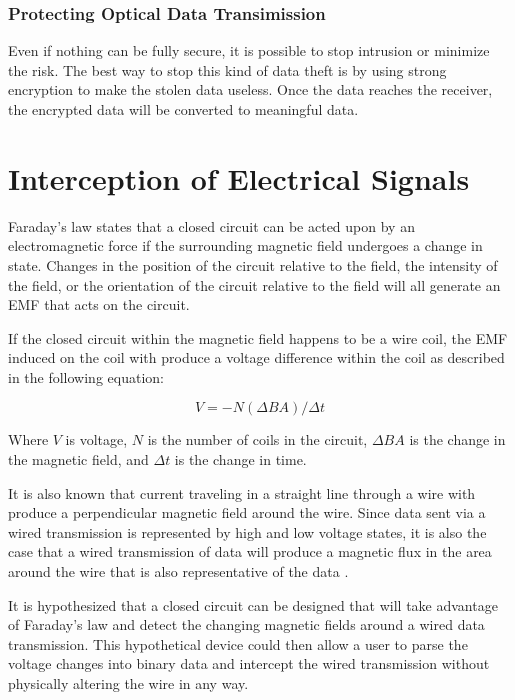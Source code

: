 \documentclass{article}
\begin{document}
\subsubsection{Protecting Optical Data Transimission}
Even if nothing can be fully secure, it is possible to stop intrusion or minimize the risk. The best way to stop this kind of data theft is by using strong encryption to make the stolen data useless. Once the data reaches the receiver, the encrypted data will be converted to meaningful data. 

\section{Interception of Electrical Signals}

Faraday's law states that a closed circuit can be acted upon by an electromagnetic force if the surrounding magnetic field undergoes a change in state. Changes in the position of the circuit relative to the field, the intensity of the field, or the orientation of the circuit relative to the field will all generate an EMF that acts on the circuit. \cite{faraday}

If the closed circuit within the magnetic field happens to be a wire coil, the EMF induced on the coil with produce a voltage difference within the coil as described in the following equation:

\begin{equation*}
 V = -N(\Delta B A)/\Delta t
 \end{equation*}
 
Where $V$ is voltage, $N$ is the number of coils in the circuit, $\Delta B A$ is the change in the magnetic field, and $\Delta t$ is the change in time.
 
It is also known that current traveling in a straight line through a wire with produce a perpendicular magnetic field around the wire. Since data sent via a wired transmission is represented by high and low voltage states, it is also the case that a wired transmission of data will produce a magnetic flux in the area around the wire that is also representative of the data \cite{magneticfields}.
 
It is hypothesized that a closed circuit can be designed that will take advantage of Faraday's law and detect the changing magnetic fields around a wired data transmission. This hypothetical device could then allow a user to parse the voltage changes into binary data and intercept the wired transmission without physically altering the wire in any way.
\end{document}
